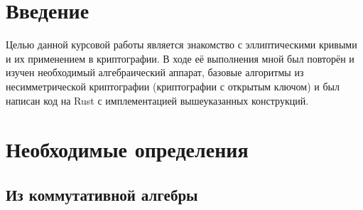 \documentclass[a4paper,14pt]{extarticle}
\begin{document}
\newpage

{
    \hypersetup{linkcolor=black}
    \tableofcontents
}

\newpage

\section{Введение}

Целью данной курсовой работы является знакомство с эллиптическими кривыми и их
применением в криптографии. В ходе её выполнения мной был повторён и изучен
необходимый алгебраический аппарат, базовые алгоритмы из несимметрической
криптографии (криптографии с открытым ключом) и был написан код на Rust с
имплементацией вышеуказанных конструкций.

\section{Необходимые определения}

\subsection{Из коммутативной алгебры}
\end{document}
